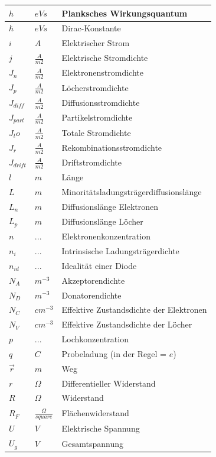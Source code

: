 \documentclass[12pt,a4paper]{report}%
\numberwithin{equation}{section}
\numberwithin{equation}{subsection}
\begin{document}
\begin{longtable} {|p{2cm}|p{3cm}|p{8.4cm}|}
	$h$ & $eVs$ & Planksches Wirkungsquantum\\ \hline
	$\hbar$ & $eVs$ & Dirac-Konstante \\ \hline
	$i$ & $A$ & Elektrischer Strom \\ \hline
	$j$ & $\frac{A}{m2}$ & Elektrische Stromdichte \\ \hline
	$J_n$ & $\frac{A}{m2}$ & Elektronenstromdichte \\ \hline
	$J_p$ & $\frac{A}{m2}$ & Löcherstromdichte \\ \hline
	$J_{diff}$ & $\frac{A}{m2}$ & Diffusionsstromdichte \\ \hline
	$J_{part}$ & $\frac{A}{m2}$ & Partikelstromdichte \\ \hline
	$J_to$ & $\frac{A}{m2}$ & Totale Stromdichte \\ \hline
	$J_r$ & $\frac{A}{m2}$ & Rekombinationsstromdichte \\ \hline
	$J_{drift}$ & $\frac{A}{m2}$ & Driftstromdichte \\ \hline
	$l$ & $m$ & Länge \\ \hline
	$L$ & $m$ & Minoritätsladungsträgerdiffusionslänge \\ \hline
	$L_n$ & $m$ & Diffusionslänge Elektronen \\ \hline
	$L_p$ & $m$ & Diffusionslänge Löcher \\ \hline
	
	$n$ & ... & Elektronenkonzentration \\ \hline
	$n_i$ & ... & Intrinsische Ladungsträgerdichte \\ \hline
	$n_{id}$ & ... & Idealität einer Diode \\ \hline
  $N_A$ & $m^{-3}$ & Akzeptorendichte \\ \hline
  $N_D$ & $m^{-3}$ & Donatorendichte \\ \hline
	$N_C$ & $cm^{-3}$ & Effektive Zustandsdichte der Elektronen \\ \hline
	$N_V$ & $cm^{-3}$ & Effektive Zustandsdichte der Löcher \\ \hline
	$p$ & ... & Lochkonzentration \\ \hline
	$q$ & $C$ & Probeladung (in der Regel = $e$) \\ \hline
	$\vec{r}$ & $m$ & Weg \\ \hline
	$r$ & $\Omega$ & Differentieller Widerstand \\ \hline
	$R$ & $\Omega$ & Widerstand \\ \hline
	$R_F$ & $\frac{\Omega}{square}$ & Flächenwiderstand \\ \hline 
	$U$ & $V$ & Elektrische Spannung \\ \hline
	$U_g$ & $V$ & Gesamtspannung \\ \hline
	 

\end{longtable}
\end{document}
